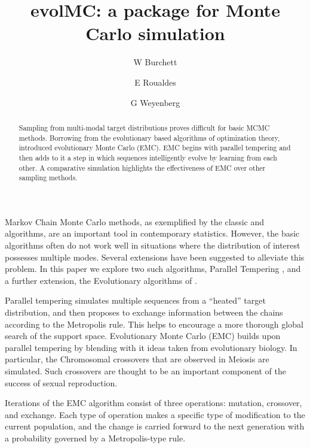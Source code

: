 \documentclass[12pt]{article}\usepackage[]{graphicx}\usepackage[]{color}
\title{evolMC: a package for Monte Carlo simulation}
\author{W Burchett \and E Roualdes \and G Weyenberg}
\begin{document}
\maketitle
\doublespacing

\begin{abstract}
  Sampling from multi-modal target distributions proves difficult for basic MCMC methods.  Borrowing from the evolutionary based algorithms of optimization theory, \cite{Liang:2000} introduced evolutionary Monte Carlo (EMC).  EMC begins with parallel tempering and then adds to it a step in which sequences intelligently evolve by learning from each other.  A comparative simulation highlights the effectiveness of EMC over other sampling methods.
\end{abstract}

\vspace{1cm}
\label{sec:introduction}
\noindent Markov Chain Monte Carlo methods, as exemplified by the classic
\cite{Metropolis:1953} and \cite{Hastings:1970} algorithms, are an
important tool in contemporary statistics.  However, the basic
algorithms often do not work well in situations where the distribution of
interest possesses multiple modes. Several extensions have been
suggested to alleviate this problem. In this paper we explore two such
algorithms, Parallel Tempering \citep{swendsen1986replica}, and a further
extension, the Evolutionary algorithms of \cite{Liang:2000}.

Parallel tempering  simulates multiple sequences from a ``heated''
target distribution, and then proposes to exchange information between
the chains according to the Metropolis rule. This helps to encourage a
more thorough global search of the support space. \citep{Liang:2011}
Evolutionary Monte Carlo (EMC) builds upon parallel tempering by
blending with it ideas taken from evolutionary biology. In particular,
the Chromosomal crossovers that are observed in Meiosis are
simulated. Such crossovers are thought to be an important component of
the success of sexual reproduction.



Iterations of the EMC algorithm consist of three operations: mutation,
crossover, and exchange. Each type of operation makes a specific type
of modification to the current population, and the change is carried
forward to the next generation with a probability governed by a
Metropolis-type rule.\citep{Liang:2011}
\end{document}
